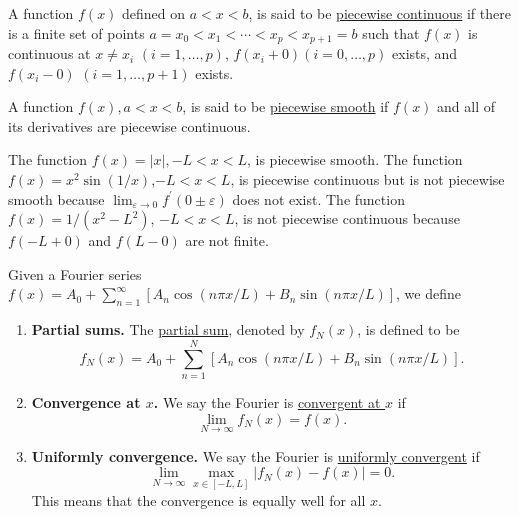 \begin{definition}
    A function $f(x)$ defined on $a<x<b$, is said to be \underline{piecewise continuous} if there is a finite set of points $a=x_0<x_1<\cdots<x_p<x_{p+1}=b$ such that $f(x)$ is continuous at $x \neq x_i$ $(i=1, \ldots, p)$, $f(x_i+0)(i=0, \ldots, p)$ exists, and $f(x_i-0)$ $(i=1, \ldots, p+1)$ exists.
\end{definition}

\begin{definition}
    A function $f(x), a<x<b$, is said to be \underline{piecewise smooth} if $f(x)$ and all of its derivatives are piecewise continuous.
\end{definition}



\begin{example}[]
    The function $f(x)=|x|,-L<x<L$, is piecewise smooth. The function $f(x)=x^2 \sin (1 / x)$,$-L<x<L$, is piecewise continuous but is not piecewise smooth because $\lim _{\varepsilon \rightarrow 0} f^{\prime}(0 \pm \varepsilon)$ does not exist. The function $f(x)=1 /\left(x^2-L^2\right)$, $-L<x<L$, is not piecewise continuous because $f(-L+0)$ and $f(L-0)$ are not finite.
\end{example}

\begin{definition}[Convergence]
Given a Fourier series $f(x) = A_0+\sum_{n=1}^{\infty}[A_n \cos (n \pi x / L)+B_n \sin (n \pi x / L)]$, we define
\begin{enumerate}
    \item \textbf{Partial sums.} The \underline{partial sum}, denoted by $f_N(x)$, is defined to be
    \begin{equation}\label{eq.partial_sum}
        f_N(x)=A_0+\sum_{n=1}^N\left[A_n \cos (n \pi x / L)+B_n \sin (n \pi x / L)\right] .
    \end{equation}
    \item \textbf{Convergence at $x$.} We say the Fourier is \underline{convergent at $x$} if 
    \begin{equation}\label{eq.convergence_at_x}
        \lim_{N\rightarrow\infty}f_N(x) = f(x).
    \end{equation}
    \item \textbf{Uniformly convergence.} We say the Fourier is \underline{uniformly convergent} if 
    \begin{equation}\label{eq.convergence_uniformly}
        \lim_{N\rightarrow\infty} \max_{x\in [-L,L]}|f_N(x) - f(x)| = 0.
    \end{equation}
    This means that the convergence is equally well for all $x$.
\end{enumerate}

\end{definition}

